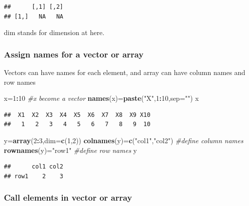 \documentclass[]{article}
\newenvironment{Shaded}{\begin{snugshade}}{\end{snugshade}}
\newcommand{\CommentTok}[1]{\textcolor[rgb]{0.56,0.35,0.01}{\textit{#1}}}
\newcommand{\DataTypeTok}[1]{\textcolor[rgb]{0.13,0.29,0.53}{#1}}
\newcommand{\DecValTok}[1]{\textcolor[rgb]{0.00,0.00,0.81}{#1}}
\newcommand{\KeywordTok}[1]{\textcolor[rgb]{0.13,0.29,0.53}{\textbf{#1}}}
\newcommand{\NormalTok}[1]{#1}
\newcommand{\OperatorTok}[1]{\textcolor[rgb]{0.81,0.36,0.00}{\textbf{#1}}}
\newcommand{\StringTok}[1]{\textcolor[rgb]{0.31,0.60,0.02}{#1}}
\begin{document}
\begin{verbatim}
##      [,1] [,2]
## [1,]   NA   NA
\end{verbatim}

dim stands for dimension at here.

\hypertarget{assign-names-for-a-vector-or-array}{%
\subsubsection{Assign names for a vector or
array}\label{assign-names-for-a-vector-or-array}}

Vectors can have names for each element, and array can have column names
and row names

\begin{Shaded}
\begin{Highlighting}[]
\NormalTok{x=}\DecValTok{1}\OperatorTok{:}\DecValTok{10} \CommentTok{#x become a vector}
\KeywordTok{names}\NormalTok{(x)=}\KeywordTok{paste}\NormalTok{(}\StringTok{"X"}\NormalTok{,}\DecValTok{1}\OperatorTok{:}\DecValTok{10}\NormalTok{,}\DataTypeTok{sep=}\StringTok{""}\NormalTok{)}
\NormalTok{x}
\end{Highlighting}
\end{Shaded}

\begin{verbatim}
##  X1  X2  X3  X4  X5  X6  X7  X8  X9 X10 
##   1   2   3   4   5   6   7   8   9  10
\end{verbatim}

\begin{Shaded}
\begin{Highlighting}[]
\NormalTok{y=}\KeywordTok{array}\NormalTok{(}\DecValTok{2}\OperatorTok{:}\DecValTok{3}\NormalTok{,}\DataTypeTok{dim=}\KeywordTok{c}\NormalTok{(}\DecValTok{1}\NormalTok{,}\DecValTok{2}\NormalTok{))}
\KeywordTok{colnames}\NormalTok{(y)=}\KeywordTok{c}\NormalTok{(}\StringTok{"col1"}\NormalTok{,}\StringTok{"col2"}\NormalTok{) }\CommentTok{#define column names}
\KeywordTok{rownames}\NormalTok{(y)=}\StringTok{"row1"} \CommentTok{#define row names}
\NormalTok{y}
\end{Highlighting}
\end{Shaded}

\begin{verbatim}
##      col1 col2
## row1    2    3
\end{verbatim}

\hypertarget{call-elements-in-vector-or-array}{%
\subsubsection{Call elements in vector or
array}\label{call-elements-in-vector-or-array}}
\end{document}
